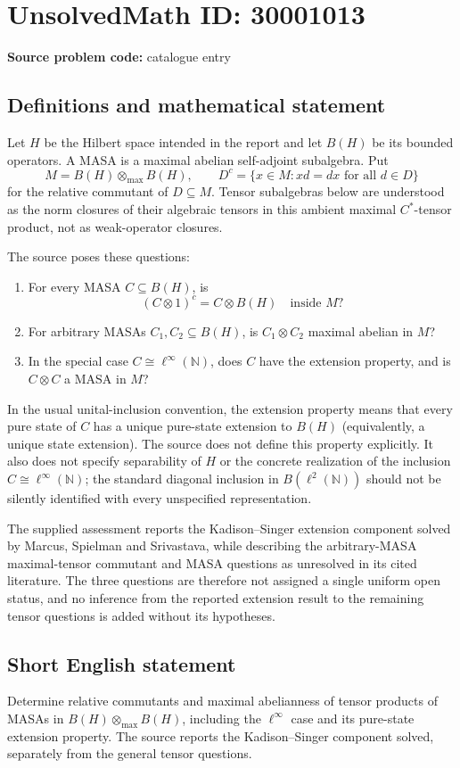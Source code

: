 \documentclass[11pt]{article}
\newcommand{\N}{\mathbb{N}}
\begin{document}
\section*{UnsolvedMath ID: 30001013}
\textbf{Source problem code:} catalogue entry
\subsection{Definitions and mathematical statement}
Let \(H\) be the Hilbert space intended in the report and let \(B(H)\) be its bounded operators. A MASA is a maximal abelian self-adjoint subalgebra. Put
\[
M=B(H)\otimes_{\max}B(H),\qquad
D^c=\{x\in M:xd=dx\text{ for all }d\in D\}
\]
for the relative commutant of \(D\subseteq M\). Tensor subalgebras below are understood as the norm closures of their algebraic tensors in this ambient maximal \(C^*\)-tensor product, not as weak-operator closures.

The source poses these questions:
\begin{enumerate}
\item For every MASA \(C\subseteq B(H)\), is
\[
(C\otimes1)^c=C\otimes B(H)\quad\text{inside }M?
\]
\item For arbitrary MASAs \(C_1,C_2\subseteq B(H)\), is \(C_1\otimes C_2\) maximal abelian in \(M\)?
\item In the special case \(C\cong\ell^\infty(\N)\), does \(C\) have the extension property, and is \(C\otimes C\) a MASA in \(M\)?
\end{enumerate}
In the usual unital-inclusion convention, the extension property means that every pure state of \(C\) has a unique pure-state extension to \(B(H)\) (equivalently, a unique state extension). The source does not define this property explicitly. It also does not specify separability of \(H\) or the concrete realization of the inclusion \(C\cong\ell^\infty(\N)\); the standard diagonal inclusion in \(B(\ell^2(\N))\) should not be silently identified with every unspecified representation.

The supplied assessment reports the Kadison--Singer extension component solved by Marcus, Spielman and Srivastava, while describing the arbitrary-MASA maximal-tensor commutant and MASA questions as unresolved in its cited literature. The three questions are therefore not assigned a single uniform open status, and no inference from the reported extension result to the remaining tensor questions is added without its hypotheses.
\subsection{Short English statement}
Determine relative commutants and maximal abelianness of tensor products of MASAs in \(B(H)\otimes_{\max}B(H)\), including the \(\ell^\infty\) case and its pure-state extension property. The source reports the Kadison--Singer component solved, separately from the general tensor questions.
\end{document}
